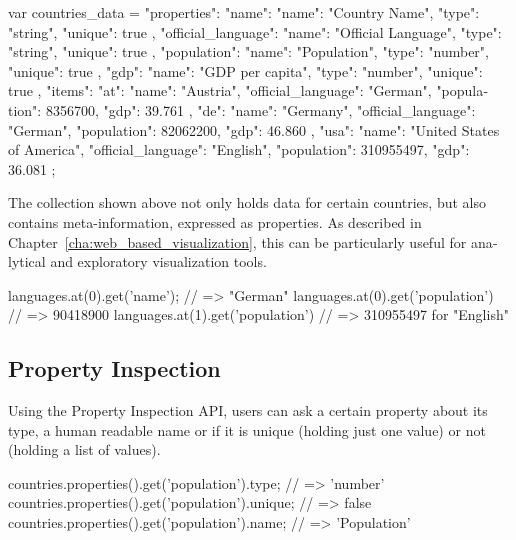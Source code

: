 \begin{english}
\begin{program}
\begin{CppSourceCode}
var countries_data = {
  "properties": {
    "name": {"name": "Country Name",
      "type": "string", "unique": true },
    "official_language": {"name": "Official Language",
       "type": "string", "unique": true },
    "population": { "name": "Population",
       "type": "number", "unique": true },
    "gdp": { "name": "GDP per capita",
      "type": "number", "unique": true }
  },
  "items": {
    "at": {
      "name": "Austria",
      "official_language": "German",
      "population": 8356700,
      "gdp": 39.761
    },
    "de": {
      "name": "Germany",
      "official_language": "German",
      "population": 82062200,
      "gdp": 46.860
    },
    "usa": {
      "name": "United States of America",
      "official_language": "English",
      "population": 310955497,
      "gdp": 36.081
    }
  }
};
\end{CppSourceCode}
\end{program}

\SuperPar The collection shown above not only holds data for certain countries, but also contains meta-information, expressed as properties. As described in Chapter~\ref{cha:web_based_visualization}, this can be particularly useful for analytical and exploratory visualization tools. 

\begin{program}
\begin{CppSourceCode}
languages.at(0).get('name'); // => "German"
languages.at(0).get('population') // => 90418900
languages.at(1).get('population') // => 310955497 for "English"
\end{CppSourceCode}
\end{program}

\subsection{Property Inspection}

Using the Property Inspection API, users can ask a certain property about its type, a human readable name or if it is unique (holding just one value) or not (holding a list of values).

\begin{program}
\begin{CppSourceCode}
countries.properties().get('population').type; // => 'number'
countries.properties().get('population').unique; // => false
countries.properties().get('population').name; // => 'Population'
\end{CppSourceCode}
\end{program}



\end{english}
